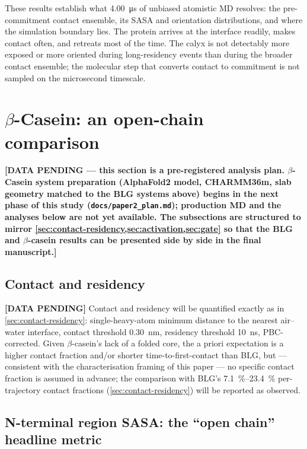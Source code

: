 \documentclass[11pt,a4paper]{article}
\begin{document}
These results establish what \SI{4.00}{\micro\second} of unbiased atomistic
MD resolves: the pre-commitment contact ensemble, its SASA and
orientation distributions, and where the simulation boundary lies. The
protein arrives at the interface readily, makes contact often, and
retreats most of the time. The calyx is not detectably more exposed or
more oriented during long-residency events than during the broader
contact ensemble; the molecular step that converts contact to commitment
is not sampled on the microsecond timescale.

\section{$\beta$-Casein: an open-chain comparison}
\label{sec:casein}

\textbf{[DATA PENDING --- this section is a pre-registered analysis plan.
$\beta$-Casein system preparation (AlphaFold2 model, CHARMM36m, slab
geometry matched to the BLG systems above) begins in the next phase of
this study (\texttt{docs/paper2\_plan.md}); production MD and the
analyses below are not yet available. The subsections are structured to
mirror \cref{sec:contact-residency,sec:activation,sec:gate} so that the
BLG and $\beta$-casein results can be presented side by side in the final
manuscript.]}

\subsection{Contact and residency}
\label{sec:casein-contact}

\textbf{[DATA PENDING]} Contact and residency will be quantified exactly
as in \cref{sec:contact-residency}: single-heavy-atom minimum distance to
the nearest air--water interface, contact threshold \SI{0.30}{\nano\metre},
residency threshold \SI{10}{\nano\second}, PBC-corrected. Given
$\beta$-casein's lack of a folded core, the a priori expectation is a
higher contact fraction and/or shorter time-to-first-contact than BLG,
but --- consistent with the characterisation framing of this paper --- no
specific contact fraction is assumed in advance; the comparison with
BLG's \SIrange{7.1}{23.4}{\percent} per-trajectory contact fractions
(\cref{sec:contact-residency}) will be reported as observed.

\subsection{N-terminal region SASA: the ``open chain'' headline metric}
\label{sec:casein-nterm}
\end{document}
